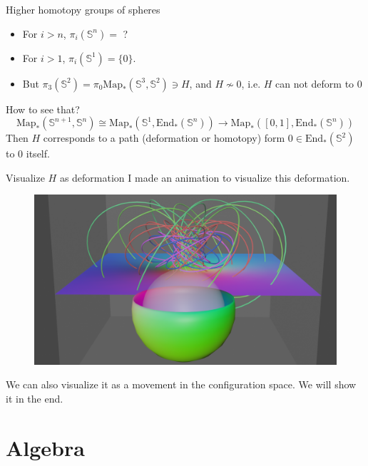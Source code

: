 \documentclass[12pt]{beamer}
\begin{document}
\begin{frame}{Higher homotopy groups of spheres}
\begin{itemize}
  \item For $i>n$, $\pi_i(\mathbb{S}^n) = $ ?
    \pause
  \item For $i>1$, $ \pi_i(\mathbb{S}^1) =\{0\}$.
    \pause
  \item But $\pi_3(\mathbb{S}^2) = \pi_0 \mathrm{Map}_*(\mathbb{S}^3,\mathbb{S}^2) \ni H $, and $H \nsim 0 $, i.e. $H$ can not deform to $0$
\end{itemize}
How to see that?
\pause
\[
  \mathrm{Map}_*(\mathbb{S}^{n+1},\mathbb{S}^n) \cong \mathrm{Map}_*(\mathbb{S}^1,\mathrm{End}_*(\mathbb{S}^n))\to \mathrm{Map}_*([0,1],\mathrm{End}_*(\mathbb{S}^n))
\]
Then $H$ corresponds to a path (deformation or homotopy) form $0\in \mathrm{End}_*(\mathbb{S}^2)$ to $0$ itself.

\end{frame}
\begin{frame}{Visualize $H$ as deformation}
  I made an animation to visualize this deformation.
  \begin{figure}
    \begin{center}
      \href{https://www.youtube.com/watch?v=TnBWwh7I3aA}{ \includegraphics[height=0.3\textheight]{figures/hopf_homotopy.png} }
    \end{center}
  \end{figure}
  \pause
  We can also visualize it as a movement in the configuration space. We will show it in the end.
 


\end{frame}
\section{Algebra}
\end{document}
